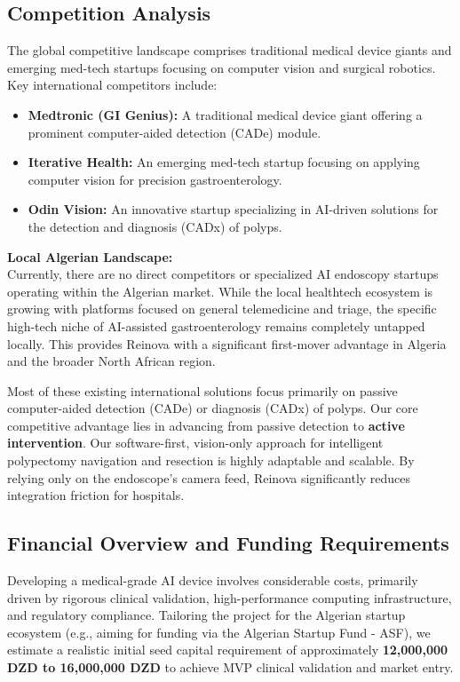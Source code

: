 \subsection{Competition Analysis}
The global competitive landscape comprises traditional medical device giants and emerging med-tech startups focusing on computer vision and surgical robotics. Key international competitors include:
\begin{itemize}
    \item \textbf{Medtronic (GI Genius):} A traditional medical device giant offering a prominent computer-aided detection (CADe) module.
    \item \textbf{Iterative Health:} An emerging med-tech startup focusing on applying computer vision for precision gastroenterology.
    \item \textbf{Odin Vision:} An innovative startup specializing in AI-driven solutions for the detection and diagnosis (CADx) of polyps.
\end{itemize}

\vspace{0.2cm}
\textbf{Local Algerian Landscape:} \\
Currently, there are no direct competitors or specialized AI endoscopy startups operating within the Algerian market. While the local healthtech ecosystem is growing with platforms focused on general telemedicine and triage, the specific high-tech niche of AI-assisted gastroenterology remains completely untapped locally. This provides Reinova with a significant first-mover advantage in Algeria and the broader North African region.

\vspace{0.2cm}
Most of these existing international solutions focus primarily on passive computer-aided detection (CADe) or diagnosis (CADx) of polyps. Our core competitive advantage lies in advancing from passive detection to \textbf{active intervention}. Our software-first, vision-only approach for intelligent polypectomy navigation and resection is highly adaptable and scalable. By relying only on the endoscope's camera feed, Reinova significantly reduces integration friction for hospitals.

\subsection{Financial Overview and Funding Requirements}
Developing a medical-grade AI device involves considerable costs, primarily driven by rigorous clinical validation, high-performance computing infrastructure, and regulatory compliance. Tailoring the project for the Algerian startup ecosystem (e.g., aiming for funding via the Algerian Startup Fund - ASF), we estimate a realistic initial seed capital requirement of approximately \textbf{12,000,000 DZD to 16,000,000 DZD} to achieve MVP clinical validation and market entry.

